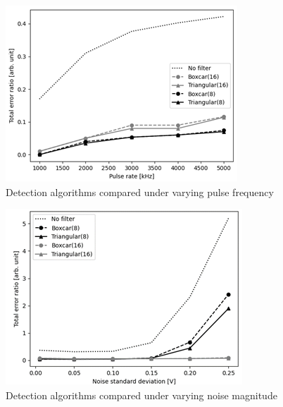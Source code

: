   \begin{figure}[H]
    \centering
      \centering
      \includegraphics[width=0.7\linewidth]{media/detection_sim_pulse_rate.png}
      \caption{Detection algorithms compared under varying pulse frequency}
      \label{fig:detection_sim_pulse_rate}
  \end{figure}
  \begin{figure}[H]
      \centering
      \includegraphics[width=0.7\linewidth]{media/detection_sim_noise.png}
      \caption{Detection algorithms compared under varying noise magnitude}
      \label{fig:detection_sim_noise}
  \end{figure}
